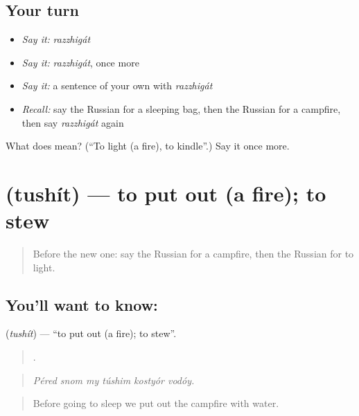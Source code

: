 \subsection*{Your turn}
\begin{itemize}
\raggedright
  \item \emph{Say it:} \emph{razzhigát}
  \item \emph{Say it:} \emph{razzhigát}, once more
  \item \emph{Say it:} a sentence of your own with \emph{razzhigát}
  \item \emph{Recall:} say the Russian for a sleeping bag, then the Russian for a campfire, then say \emph{razzhigát} again
\end{itemize}

\begin{tcolorbox}[breakable,colback=teal!4,colframe=teal!35!black,title={Before you move on}]
What does  mean? (\textquotedblleft{}To light (a fire), to kindle\textquotedblright{}.) Say it once more.
\end{tcolorbox}
\section[\texorpdfstring{\ru{тушить} (tushít)}{тушить (tushít)}]{ (tushít) — to put out (a fire); to stew}

\label{lesson:RU-C462-tushit}



\begin{quote}
Before the new one: say the Russian for a campfire, then the Russian for to light.
\end{quote}

\subsection*{You'll want to know: }
\textbf{} (\emph{tushít}) — \textquotedblleft{}to put out (a fire); to stew\textquotedblright{}.

\begin{quote}
     .
\end{quote}

\begin{quote}
\emph{Péred snom my túshim kostyór vodóy.}
\end{quote}

\begin{quote}
Before going to sleep we put out the campfire with water.
\end{quote}

